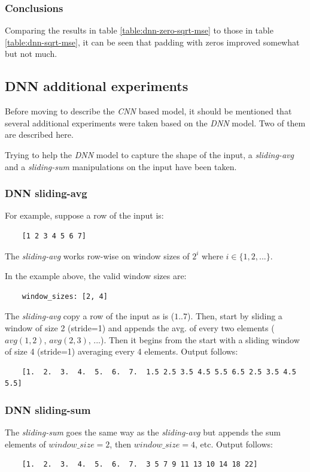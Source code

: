 \documentclass[a4paper, 12pt]{report}
\begin{document}
\subsubsection{Conclusions}
Comparing the results in table \ref{table:dnn-zero-sqrt-mse} to those in table \ref{table:dnn-sqrt-mse}, it can be seen that padding with zeros improved somewhat but not much. 

\subsection{DNN additional experiments}
Before moving to describe the \textit{CNN} based model, it should be mentioned that several additional experiments were taken based on the \textit{DNN} model. Two of them are described here.

Trying to help the \textit{DNN} model to capture the shape of the input, a \textit{sliding-avg} and a \textit{sliding-sum} manipulations on the input have been taken.

\subsubsection{DNN sliding-avg}
For example, suppose a row of the input is:
\begin{verbatim}
    [1 2 3 4 5 6 7]
\end{verbatim}

The \textit{sliding-avg} works row-wise on window sizes of $2^i$ where $i \in \{1,2,...\}$.

In the example above, the valid window sizes are:
\begin{verbatim}
    window_sizes: [2, 4]
\end{verbatim}

The \textit{sliding-avg} copy a row of the input as is ($1..7$). Then, start by sliding a window of size 2 (stride=1) and appends the avg. of every two elements ($avg(1,2)$, $avg(2,3)$, ...). Then it begins from the start with a sliding window of size 4 (stride=1) averaging every 4 elements. Output follows:
\begin{verbatim}
    [1.  2.  3.  4.  5.  6.  7.  1.5 2.5 3.5 4.5 5.5 6.5 2.5 3.5 4.5 5.5]
\end{verbatim}

\subsubsection{DNN sliding-sum}
The \textit{sliding-sum} goes the same way as the \textit{sliding-avg} but appends the sum elements of $window\_size=2$, then $window\_size=4$, etc. Output follows:
\begin{verbatim}
    [1.  2.  3.  4.  5.  6.  7.  3 5 7 9 11 13 10 14 18 22]
\end{verbatim}
\end{document}

